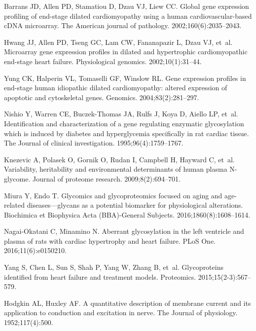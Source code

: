 \documentclass[10pt,letterpaper]{article}
\begin{document}
\begin{thebibliography}{10}
Barrans JD, Allen PD, Stamatiou D, Dzau VJ, Liew CC.
\newblock Global gene expression profiling of end-stage dilated cardiomyopathy
  using a human cardiovascular-based cDNA microarray.
\newblock The American journal of pathology. 2002;160(6):2035--2043.

Hwang JJ, Allen PD, Tseng GC, Lam CW, Fananapazir L, Dzau VJ, et~al.
\newblock Microarray gene expression profiles in dilated and hypertrophic
  cardiomyopathic end-stage heart failure.
\newblock Physiological genomics. 2002;10(1):31--44.

Yung CK, Halperin VL, Tomaselli GF, Winslow RL.
\newblock Gene expression profiles in end-stage human idiopathic dilated
  cardiomyopathy: altered expression of apoptotic and cytoskeletal genes.
\newblock Genomics. 2004;83(2):281--297.

Nishio Y, Warren CE, Buczek-Thomas JA, Rulfs J, Koya D, Aiello LP, et~al.
\newblock Identification and characterization of a gene regulating enzymatic
  glycosylation which is induced by diabetes and hyperglycemia specifically in
  rat cardiac tissue.
\newblock The Journal of clinical investigation. 1995;96(4):1759--1767.

Knezevic A, Polasek O, Gornik O, Rudan I, Campbell H, Hayward C, et~al.
\newblock Variability, heritability and environmental determinants of human
  plasma N-glycome.
\newblock Journal of proteome research. 2009;8(2):694--701.

Miura Y, Endo T.
\newblock Glycomics and glycoproteomics focused on aging and age-related
  diseases—glycans as a potential biomarker for physiological alterations.
\newblock Biochimica et Biophysica Acta (BBA)-General Subjects.
  2016;1860(8):1608--1614.

Nagai-Okatani C, Minamino N.
\newblock Aberrant glycosylation in the left ventricle and plasma of rats with
  cardiac hypertrophy and heart failure.
\newblock PLoS One. 2016;11(6):e0150210.

Yang S, Chen L, Sun S, Shah P, Yang W, Zhang B, et~al.
\newblock Glycoproteins identified from heart failure and treatment models.
\newblock Proteomics. 2015;15(2-3):567--579.

Hodgkin AL, Huxley AF.
\newblock A quantitative description of membrane current and its application to
  conduction and excitation in nerve.
\newblock The Journal of physiology. 1952;117(4):500.


\end{thebibliography}
\end{document}

